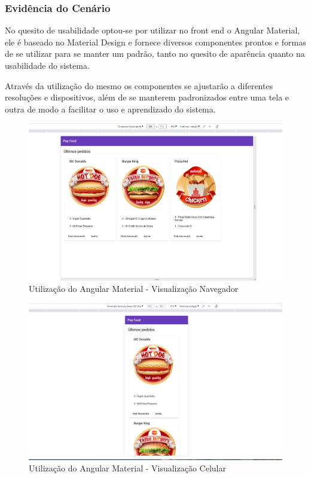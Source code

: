 \subsubsection{Evidência do Cenário \avcen} 

No quesito de usabilidade optou-se por utilizar no front end o Angular Material, ele é baseado no Material Design e fornece
diversos componentes prontos e formas de se utilizar para se manter um padrão, tanto no quesito de aparência quanto na usabilidade do sistema.

Através da utilização do mesmo os componentes se ajustarão a diferentes resoluções e dispositivos, além de se manterem padronizados entre uma tela e outra de modo a facilitar o uso e aprendizado do sistema.

\begin{figure}[ht]
    \centering
    \includegraphics[width=1\textwidth]{front_end_navegador_material.png}
    \caption{Utilização do Angular Material - Visualização Navegador}
    \label{fig:Angular Material}
 \end{figure}

 \begin{figure}[ht]
    \centering
    \includegraphics[width=1\textwidth]{front_end_celular_material.png}
    \caption{Utilização do Angular Material - Visualização Celular}
    \label{fig:Angular Material Celular}
 \end{figure}



